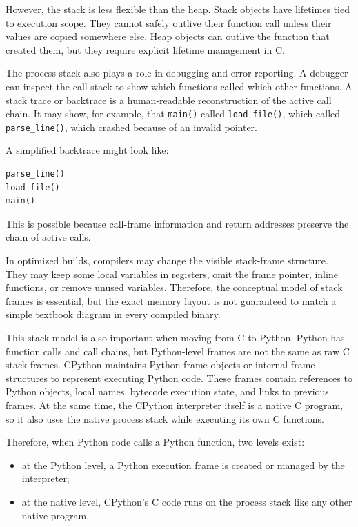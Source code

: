 However, the stack is less flexible than the heap. Stack objects have lifetimes tied to execution scope. They cannot safely outlive their function call unless their values are copied somewhere else. Heap objects can outlive the function that created them, but they require explicit lifetime management in C.

The process stack also plays a role in debugging and error reporting. A debugger can inspect the call stack to show which functions called which other functions. A stack trace or backtrace is a human-readable reconstruction of the active call chain. It may show, for example, that \texttt{main()} called \texttt{load\_file()}, which called \texttt{parse\_line()}, which crashed because of an invalid pointer.

A simplified backtrace might look like:

\begin{verbatim}
parse_line()
load_file()
main()
\end{verbatim}

This is possible because call-frame information and return addresses preserve the chain of active calls.

In optimized builds, compilers may change the visible stack-frame structure. They may keep some local variables in registers, omit the frame pointer, inline functions, or remove unused variables. Therefore, the conceptual model of stack frames is essential, but the exact memory layout is not guaranteed to match a simple textbook diagram in every compiled binary.

This stack model is also important when moving from C to Python. Python has function calls and call chains, but Python-level frames are not the same as raw C stack frames. CPython maintains Python frame objects or internal frame structures to represent executing Python code. These frames contain references to Python objects, local names, bytecode execution state, and links to previous frames. At the same time, the CPython interpreter itself is a native C program, so it also uses the native process stack while executing its own C functions.

Therefore, when Python code calls a Python function, two levels exist:

\begin{itemize}
    \item at the Python level, a Python execution frame is created or managed by the interpreter;
    \item at the native level, CPython's C code runs on the process stack like any other native program.
\end{itemize}

